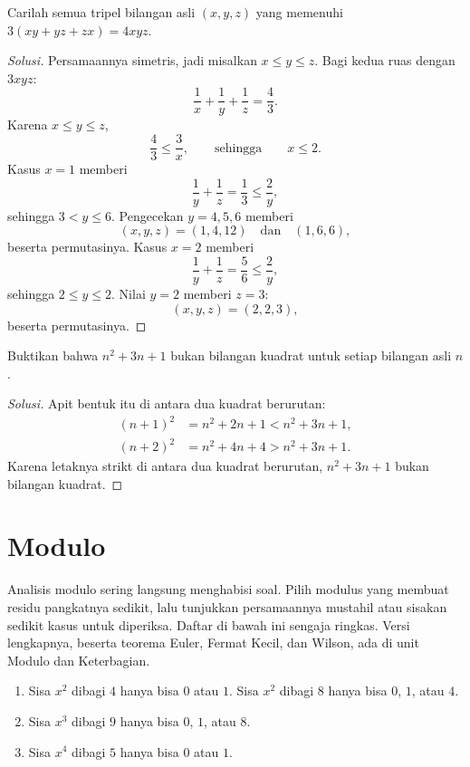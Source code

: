 \documentclass[12pt]{scrartcl}
\begin{document}
\begin{example}
Carilah semua tripel bilangan asli $(x, y, z)$ yang memenuhi $3(xy + yz + zx) = 4xyz$.
\end{example}
\begin{proof}[Solusi]
Persamaannya simetris, jadi misalkan $x \le y \le z$.
Bagi kedua ruas dengan $3xyz$:
\[ \frac{1}{x} + \frac{1}{y} + \frac{1}{z} = \frac{4}{3}. \]
Karena $x \le y \le z$,
\[ \frac{4}{3} \le \frac{3}{x}, \qquad \text{sehingga} \qquad x \le 2. \]
Kasus $x = 1$ memberi
\[ \frac{1}{y} + \frac{1}{z} = \frac{1}{3} \le \frac{2}{y}, \]
sehingga $3 < y \le 6$. Pengecekan $y = 4, 5, 6$ memberi
\[ (x, y, z) = (1, 4, 12) \quad \text{dan} \quad (1, 6, 6), \]
beserta permutasinya. Kasus $x = 2$ memberi
\[ \frac{1}{y} + \frac{1}{z} = \frac{5}{6} \le \frac{2}{y}, \]
sehingga $2 \le y \le 2$. Nilai $y = 2$ memberi $z = 3$:
\[ (x, y, z) = (2, 2, 3), \]
beserta permutasinya.
\end{proof}

\begin{example}
Buktikan bahwa $n^2 + 3n + 1$ bukan bilangan kuadrat untuk setiap bilangan asli $n$.
\end{example}
\begin{proof}[Solusi]
Apit bentuk itu di antara dua kuadrat berurutan:
\begin{align*}
(n + 1)^2 &= n^2 + 2n + 1 < n^2 + 3n + 1, \\
(n + 2)^2 &= n^2 + 4n + 4 > n^2 + 3n + 1.
\end{align*}
Karena letaknya strikt di antara dua kuadrat berurutan,
$n^2 + 3n + 1$ bukan bilangan kuadrat.
\end{proof}

\section{Modulo}

Analisis modulo sering langsung menghabisi soal.
Pilih modulus yang membuat residu pangkatnya sedikit,
lalu tunjukkan persamaannya mustahil atau sisakan sedikit kasus untuk diperiksa.
Daftar di bawah ini sengaja ringkas.
Versi lengkapnya, beserta teorema Euler, Fermat Kecil, dan Wilson,
ada di unit Modulo dan Keterbagian.

\begin{fact}
\begin{enumerate}
    \item Sisa $x^2$ dibagi $4$ hanya bisa $0$ atau $1$.
    Sisa $x^2$ dibagi $8$ hanya bisa $0$, $1$, atau $4$.
    \item Sisa $x^3$ dibagi $9$ hanya bisa $0$, $1$, atau $8$.
    \item Sisa $x^4$ dibagi $5$ hanya bisa $0$ atau $1$.
\end{enumerate}
\end{fact}
\end{document}
